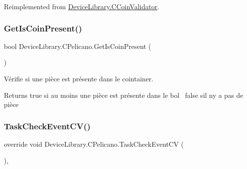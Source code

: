 Reimplemented from \mbox{\hyperlink{class_device_library_1_1_c_coin_validator_ad5060d28baf7c2abedc788c6bcdcb02d}{Device\+Library.\+C\+Coin\+Validator}}.

\mbox{\label{class_device_library_1_1_c_pelicano_a8858d106bae3622a44e9ba49f5a4b98a}} 
\subsubsection{\texorpdfstring{Get\+Is\+Coin\+Present()}{GetIsCoinPresent()}}
{\footnotesize\ttfamily bool Device\+Library.\+C\+Pelicano.\+Get\+Is\+Coin\+Present (\begin{DoxyParamCaption}{ }\end{DoxyParamCaption})\hspace{0.3cm}{\ttfamily [inline]}}



Vérifie si une pièce est présente dans le cointainer. 

\begin{DoxyReturn}{Returns}
true si au moins une pièce est présente dans le bol~\newline
false s\textquotesingle{}il n\textquotesingle{}y a pas de pièce 
\end{DoxyReturn}
\mbox{\label{class_device_library_1_1_c_pelicano_a38a0d7a675ff22773f5eb153fab9275a}} 
\subsubsection{\texorpdfstring{Task\+Check\+Event\+C\+V()}{TaskCheckEventCV()}}
{\footnotesize\ttfamily override void Device\+Library.\+C\+Pelicano.\+Task\+Check\+Event\+CV (\begin{DoxyParamCaption}{ }\end{DoxyParamCaption})\hspace{0.3cm}{\ttfamily [inline]}, {\ttfamily [virtual]}}



